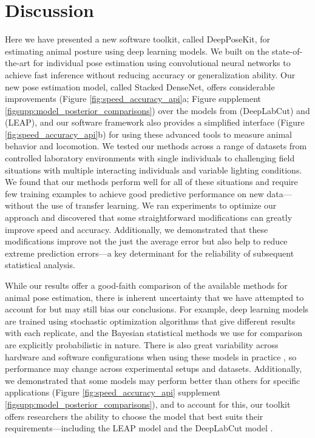 \documentclass[11pt,a4paper,oneside]{book}
\begin{document}
\section{Discussion}
Here we have presented a new software toolkit, called DeepPoseKit, for estimating animal posture using deep learning models. We built on the state-of-the-art for individual pose estimation using convolutional neural networks to achieve fast inference without reducing accuracy or generalization ability. Our new pose estimation model, called Stacked DenseNet, offers considerable improvements (Figure \ref{fig:speed_accuracy_api}a; Figure supplement \ref{figsupp:model_posterior_comparisons}) over the models from \cite{mathis2018deeplabcut} (DeepLabCut) and \cite{pereira2019fast} (LEAP), and our software framework also provides a simplified interface (Figure \ref{fig:speed_accuracy_api}b) for using these advanced tools to measure animal behavior and locomotion. We tested our methods across a range of datasets from controlled laboratory environments with single individuals to challenging field situations with multiple interacting individuals and variable lighting conditions. We found that our methods perform well for all of these situations and require few training examples to achieve good predictive performance on new data---without the use of transfer learning. We ran experiments to optimize our approach and discovered that some straightforward modifications can greatly improve speed and accuracy. Additionally, we demonstrated that these modifications improve not the just the average error but also help to reduce extreme prediction errors—a key determinant for the reliability of subsequent statistical analysis.

While our results offer a good-faith comparison of the available methods for animal pose estimation, there is inherent uncertainty that we have attempted to account for but may still bias our conclusions. For example, deep learning models are trained using stochastic optimization algorithms that give different results with each replicate, and the Bayesian statistical methods we use for comparison are explicitly probabilistic in nature. There is also great variability across hardware and software configurations when using these models in practice \citep{mathis2018inference}, so performance may change across experimental setups and datasets. Additionally, we demonstrated that some models may perform better than others for specific applications (Figure \ref{fig:speed_accuracy_api} supplement \ref{figsupp:model_posterior_comparisons}), and to account for this, our toolkit offers researchers the ability to choose the model that best suits their requirements—including the LEAP model \citep{pereira2019fast} and the DeepLabCut model \citep{mathis2018deeplabcut}.  
\end{document}
